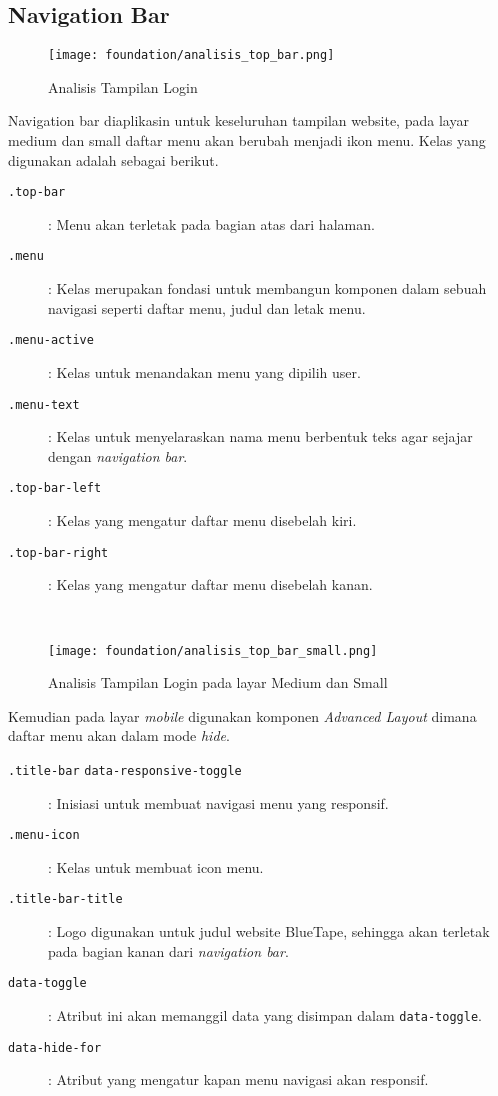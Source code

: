 \subsection{Navigation Bar}
\begin{figure} [H]
	\centering  
	\texttt{[image: foundation/analisis\_top\_bar.png]}  
	\caption{Analisis Tampilan Login} 
\end{figure}
Navigation bar diaplikasin untuk keseluruhan tampilan website, pada layar medium dan small daftar menu akan berubah menjadi ikon menu.
Kelas yang digunakan adalah sebagai berikut.
\begin{description}
	\item [\texttt{.top-bar}]	: Menu akan terletak pada bagian atas dari halaman.	
	\item [\texttt{.menu}]	: Kelas merupakan fondasi untuk membangun komponen dalam sebuah navigasi seperti daftar menu, judul dan letak menu.
	\item [\texttt{.menu-active}] : Kelas untuk menandakan menu yang dipilih user.
	\item [\texttt{.menu-text}] : Kelas untuk menyelaraskan nama menu berbentuk teks agar sejajar dengan \textit{navigation bar}.	
	\item [\texttt{.top-bar-left}] : Kelas yang mengatur daftar menu disebelah kiri.
	\item [\texttt{.top-bar-right}] : Kelas yang mengatur daftar menu disebelah kanan.
\end{description} \noindent \\
\begin{figure} [H]
	\centering  
	\texttt{[image: foundation/analisis\_top\_bar\_small.png]}  
	\caption{Analisis Tampilan Login pada layar Medium dan Small} 
\end{figure}
Kemudian pada layar \textit{mobile} digunakan komponen \textit{Advanced Layout} dimana daftar menu akan dalam mode \textit{hide}.
\begin{description}	
	\item [\texttt{.title-bar} \texttt{data-responsive-toggle}] : Inisiasi untuk membuat navigasi menu yang responsif. 
	\item [\texttt{.menu-icon}] : Kelas untuk membuat icon menu.
	\item [\texttt{.title-bar-title}]	: Logo digunakan untuk judul website BlueTape, sehingga akan terletak pada bagian kanan dari \textit{navigation bar}.
	\item [\texttt{data-toggle}] : Atribut ini akan memanggil data yang disimpan dalam \texttt{data-toggle}.	
	\item [\texttt{data-hide-for}] : Atribut yang mengatur kapan menu navigasi akan responsif.
\end{description}
 
